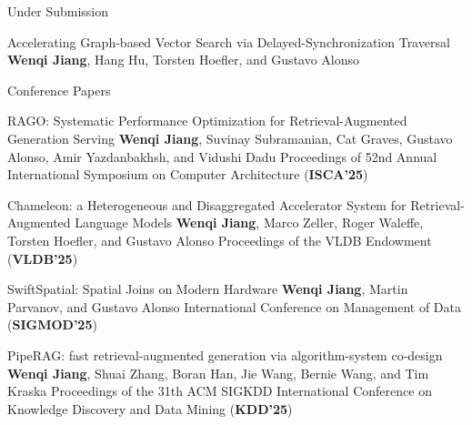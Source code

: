 

\begin{rSection}{Under Submission}
\begin{enumerate}[label={[\arabic*]}]

\item 
\begin{Pub}{Accelerating Graph-based Vector Search via Delayed-Synchronization Traversal}
{\textbf{Wenqi Jiang}, Hang Hu, Torsten Hoefler, and Gustavo Alonso}
{}
\end{Pub}\end{enumerate}
\end{rSection}



\begin{rSection}{Conference Papers}
\begin{enumerate}[label={[\arabic*]}]

\item 
\begin{Pub}{RAGO: Systematic Performance Optimization for Retrieval-Augmented Generation Serving}
{\textbf{Wenqi Jiang}, Suvinay Subramanian, Cat Graves, Gustavo Alonso, Amir Yazdanbakhsh, and Vidushi Dadu}
{Proceedings of 52nd Annual International Symposium on Computer Architecture (\textbf{ISCA'25})}
\end{Pub}

\item 
\begin{Pub}{Chameleon: a Heterogeneous and Disaggregated Accelerator System for Retrieval-Augmented Language Models}
{\textbf{Wenqi Jiang}, Marco Zeller, Roger Waleffe, Torsten Hoefler, and Gustavo Alonso}
{Proceedings of the VLDB Endowment (\textbf{VLDB'25})}
\end{Pub}

\item 
\begin{Pub}{SwiftSpatial: Spatial Joins on Modern Hardware}
{\textbf{Wenqi Jiang}, Martin Parvanov, and Gustavo Alonso}
{International Conference on Management of Data (\textbf{SIGMOD'25})}
\end{Pub}

\item 
\begin{Pub}{PipeRAG: fast retrieval-augmented generation via algorithm-system co-design}
{\textbf{Wenqi Jiang}, Shuai Zhang, Boran Han, Jie Wang, Bernie Wang, and Tim Kraska}
{Proceedings of the 31th ACM SIGKDD International Conference on Knowledge Discovery and Data Mining (\textbf{KDD'25})}
\end{Pub}


\end{enumerate}
\end{rSection}
